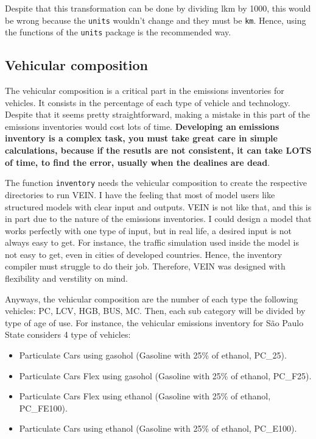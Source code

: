 \documentclass[12pt,graybox,envcountchap,sectrefs]{krantz}
\providecommand{\tightlist}{%
  \setlength{\itemsep}{0pt}\setlength{\parskip}{0pt}}
\theoremstyle{definition}
\theoremstyle{definition}
\theoremstyle{definition}
\theoremstyle{remark}
\begin{document}
Despite that this transformation can be done by dividing lkm by 1000,
this would be wrong because the \texttt{units} wouldn't change and they
must be \texttt{km}. Hence, using the functions of the \texttt{units}
package is the recommended way.

\subsection{Vehicular composition}\label{vehicular-composition-2}

The vehicular composition is a critical part in the emissions
inventories for vehicles. It consists in the percentage of each type of
vehicle and technology. Despite that it seems pretty straightforward,
making a mistake in this part of the emissions inventories would cost
lots of time. \textbf{Developing an} \textbf{emissions inventory is a
complex task, you must take great care in simple} \textbf{calculations,
because if the resutls are not consistent, it can take LOTS} \textbf{of
time, to find the error, usually when the dealines are dead}.

The function \texttt{inventory} needs the vehicular composition to
create the respective directories to run VEIN. I have the feeling that
most of model users like structured models with clear input and outputs.
VEIN is not like that, and this is in part due to the nature of the
emissions inventories. I could design a model that works perfectly with
one type of input, but in real life, a desired input is not always easy
to get. For instance, the traffic simulation used inside the model is
not easy to get, even in cities of developed countries. Hence, the
inventory compiler must struggle to do their job. Therefore, VEIN was
designed with flexibility and verstility on mind.

Anyways, the vehicular composition are the number of each type the
following vehicles: PC, LCV, HGB, BUS, MC. Then, each sub category will
be divided by type of age of use. For instance, the vehicular emissions
inventory for São Paulo State considers 4 type of vehicles:

\begin{itemize}
\tightlist
\item
  Particulate Cars using gasohol (Gasoline with 25\% of ethanol,
  PC\_25).
\item
  Particulate Cars Flex using gasohol (Gasoline with 25\% of ethanol,
  PC\_F25).
\item
  Particulate Cars Flex using ethanol (Gasoline with 25\% of ethanol,
  PC\_FE100).
\item
  Particulate Cars using ethanol (Gasoline with 25\% of ethanol,
  PC\_E100).
\end{itemize}
\end{document}
